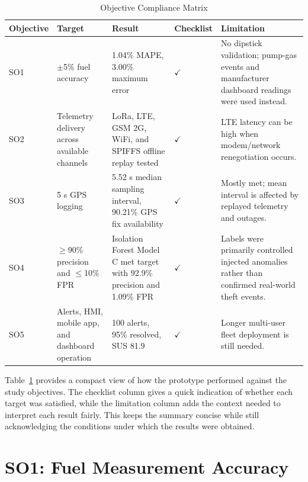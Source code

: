 \begin{table}[!htbp]
\centering
\caption{Objective Compliance Matrix}
\label{tab:objective_compliance_matrix}
\scriptsize
\setlength{\tabcolsep}{3pt}
\renewcommand{\arraystretch}{1.15}
\begin{tabularx}{\textwidth}{|p{}|p{}|p{}|p{}|X|}
\hline
\textbf{Objective} & \textbf{Target} & \textbf{Result} & \textbf{Checklist} & \textbf{Limitation} \\
\hline
SO1 & $\pm$5\% fuel accuracy & 1.04\% MAPE, 3.00\% maximum error & \centering$\checkmark$ & No dipstick validation; pump-gas events and manufacturer dashboard readings were used instead. \\
\hline
SO2 & Telemetry delivery across available channels & LoRa, LTE, GSM 2G, WiFi, and SPIFFS offline replay tested & \centering$\checkmark$ & LTE latency can be high when modem/network renegotiation occurs. \\
\hline
SO3 & 5 s GPS logging & 5.52 s median sampling interval, 90.21\% GPS fix availability & \centering$\checkmark$ & Mostly met; mean interval is affected by replayed telemetry and outages. \\
\hline
SO4 & $\geq$90\% precision and $\leq$10\% FPR & Isolation Forest Model C met target with 92.9\% precision and 1.09\% FPR & \centering$\checkmark$ & Labels were primarily controlled injected anomalies rather than confirmed real-world theft events. \\
\hline
SO5 & Alerts, HMI, mobile app, and dashboard operation & 100 alerts, 95\% resolved, SUS 81.9 & \centering$\checkmark$ & Longer multi-user fleet deployment is still needed. \\
\hline
\end{tabularx}
\normalsize
\end{table}

Table~\ref{tab:objective_compliance_matrix} provides a compact view of how the prototype performed against the study objectives. The checklist column gives a quick indication of whether each target was satisfied, while the limitation column adds the context needed to interpret each result fairly. This keeps the summary concise while still acknowledging the conditions under which the results were obtained.

\section{SO1: Fuel Measurement Accuracy}
\label{sec:results_so1}

